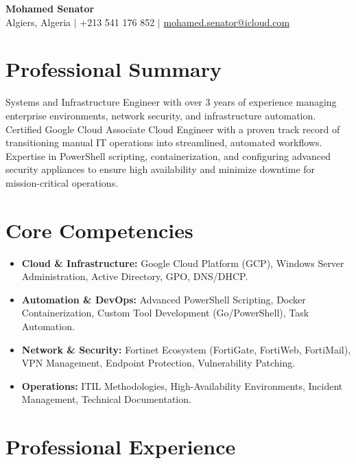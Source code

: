 \documentclass[11pt,a4paper]{article}
\begin{document}
\begin{center}
    {\huge \textbf{Mohamed Senator}} \\ \vspace{2mm}
    Algiers, Algeria $|$ +213 541 176 852 $|$ \href{mailto:mohamed.senator@icloud.com}{mohamed.senator@icloud.com}
\end{center}

\vspace{-2mm}

\section*{Professional Summary}
Systems and Infrastructure Engineer with over 3 years of experience managing enterprise environments, network security, and infrastructure automation. Certified Google Cloud Associate Cloud Engineer with a proven track record of transitioning manual IT operations into streamlined, automated workflows. Expertise in PowerShell scripting, containerization, and configuring advanced security appliances to ensure high availability and minimize downtime for mission-critical operations.

\section*{Core Competencies}
\begin{itemize}[leftmargin=0.15in, label={}, itemsep=2pt]
    \item \textbf{Cloud \& Infrastructure:} Google Cloud Platform (GCP), Windows Server Administration, Active Directory, GPO, DNS/DHCP.
    \item \textbf{Automation \& DevOps:} Advanced PowerShell Scripting, Docker Containerization, Custom Tool Development (Go/PowerShell), Task Automation.
    \item \textbf{Network \& Security:} Fortinet Ecosystem (FortiGate, FortiWeb, FortiMail), VPN Management, Endpoint Protection, Vulnerability Patching.
    \item \textbf{Operations:} ITIL Methodologies, High-Availability Environments, Incident Management, Technical Documentation.
\end{itemize}

\section*{Professional Experience}
\end{document}
